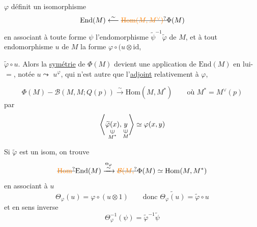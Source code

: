 $\varphi$ définit un isomorphisme
\[
\mathrm{End}(M)\mathrel{\mathop{\longleftarrow}\limits^{\sim}}\deleted{\unsure{\mathrm{Hom}(M,M^{\vee})}}\Phi(M)
\]
en associant à toute forme $\psi$ l'endomorphisme
$\widetilde\psi^{-1}\widetilde\varphi$ de $M$, et à tout
endomorphisme $u$ de $M$ la
forme $\varphi\circ(u\otimes\mathrm{id}$,  



$\widetilde\varphi\circ u$. Alors la \uline{symétrie} de $\Phi(M)$ devient
une application de $\mathrm{End}(M)$ en lui-$=$, notée $u\leadsto$
$u^\varphi$, qui n'est autre que l'\uline{adjoint}
relativement à $\varphi$,


\[
\Phi(M)-\mathcal B(M,M;Q(p))\xrightarrow{\sim}\mathrm{Hom}(M,M^*)\qquad\text{où }M^*=M^\vee(p)
\]
par
\[
\left\langle\underset{\substack{\rotatebox{90}{$\in$}\\ M^*}}{\widetilde\varphi(x)},\underset{\substack{\rotatebox{90}{$\in$}\\ M}}{y}\right\rangle\simeq\varphi(x,y)
\]

Si $\widetilde\varphi$ est un isom, on trouve
\[
\deleted{\unsure{\mathrm{Hom}}}\mathrm{End}(M)\xrightarrow{\overset{\Theta_\varphi}{\sim}}\deleted{\unsure{\mathcal B(M,}}\Phi(M)\simeq\mathrm{Hom}(M,M^*)
\]
en associant à $u$
\[
\Theta_\varphi(u)=\varphi\circ(u\otimes1)\qquad\text{donc }\widetilde{\Theta_\varphi(u)}=\widetilde\varphi\circ u
\]
et en sens inverse
\[
\Theta_\varphi^{-1}(\psi)=\widetilde\varphi^{-1}\widetilde\psi
\]

